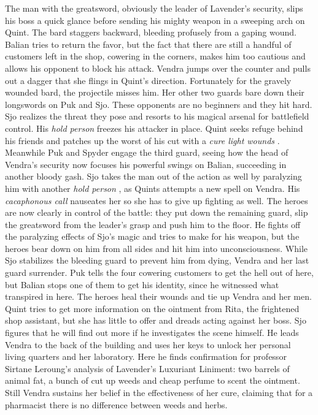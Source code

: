 The man with the greatsword, obviously the leader of Lavender's security, slips his boss a quick glance before sending his mighty weapon in a sweeping arch on Quint. The bard staggers backward, bleeding profusely from a gaping wound. Balian tries to return the favor, but the fact that there are still a handful of customers left in the shop, cowering in the corners, makes him too cautious and allows his opponent to block his attack. Vendra jumps over the counter and pulls out a dagger that she flings in Quint's direction. Fortunately for the gravely wounded bard, the projectile misses him. Her other two guards bare down their longswords on Puk and Sjo. These opponents are no beginners and they hit hard. Sjo realizes the threat they pose and resorts to his magical arsenal for battlefield control. His {\itshape hold person} freezes his attacker in place. Quint seeks refuge behind his friends and patches up the worst of his cut with a  {\itshape cure light wounds} . Meanwhile Puk and Spyder engage the third guard, seeing how the head of Vendra's security now focuses his powerful swings on Balian, succeeding in another bloody gash. Sjo takes the man out of the action as well by paralyzing him with another  {\itshape hold person} , as Quints attempts a new spell on Vendra. His  {\itshape cacaphonous call} nauseates her so she has to give up fighting as well. The heroes are now clearly in control of the battle: they put down the remaining guard, slip the greatsword from the leader's grasp and push him to the floor. He fights off the paralyzing effects of Sjo's magic and tries to make for his weapon, but the heroes bear down on him from all sides and hit him into unconsciousness. While Sjo stabilizes the bleeding guard to prevent him from dying, Vendra and her last guard surrender. Puk tells the four cowering customers to get the hell out of here, but Balian stops one of them to get his identity, since he witnessed what transpired in here. The heroes heal their wounds and tie up Vendra and her men. Quint tries to get more information on the ointment from Rita, the frightened shop assistant, but she has little to offer and dreads acting against her boss. Sjo figures that he will find out more if he investigates the scene himself. He leads Vendra to the back of the building and uses her keys to unlock her personal living quarters and her laboratory. Here he finds confirmation for professor Sirtane Leroung's analysis of Lavender's Luxuriant Liniment: two barrels of animal fat, a bunch of cut up weeds and cheap perfume to scent the ointment. Still Vendra sustains her belief in the effectiveness of her cure, claiming that for a pharmacist there is no difference between weeds and herbs.\\

